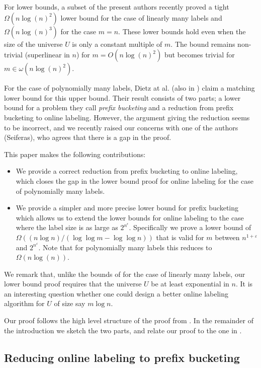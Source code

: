 \documentclass[runningheads,a4paper]{llncs}
\begin{document}
For lower bounds, a subset of the present authors 
recently proved \cite{BKS} a tight $\Omega(n \log(n)^2)$ lower bound for the case of linearly many labels and $\Omega(n \log(n)^3)$ for
the case $m=n$. These lower bounds hold even when the size of the universe $U$ is only a constant multiple of $m$.  The bound remains
non-trivial (superlinear in $n$) for $m  = O(n \log(n)^2)$ but
becomes trivial  for $m \in \omega(n \log(n)^2)$. 

For the case of polynomially many labels,
Dietz at al. \cite{DSZ04} (also in \cite{Zhang}) claim a matching lower bound for this upper bound.
Their result consists of two parts; a lower bound for a problem they call {\em prefix bucketing}
and a reduction from  prefix bucketing to online labeling.  However, the argument giving the reduction seems to be incorrect, 
and we recently raised our concerns with one of the authors (Seiferas), who agrees that
there is a gap in the proof. 

This paper makes the following contributions:

\begin{itemize}
\item We provide a correct reduction from prefix bucketing to  online labeling, which closes the gap in the lower
bound proof for online labeling for the case of polynomially many labels.
\item We provide a simpler and more precise lower bound for prefix bucketing which allows us to extend the lower bounds
for online labeling to the case where the label size is as large as $2^{n^\epsilon}$.
Specifically we prove a lower bound of $\Omega((n \log n) / (\log \log m - \log \log n))$ that is valid
for $m$ between $n^{1+\varepsilon}$ and $2^{n^{\varepsilon}}$.   Note that for
polynomially many labels this reduces to $\Omega(n \log(n))$. 
\end{itemize}

We remark that, unlike the bounds of \cite{BKS} for the case of linearly many labels, our lower bound proof requires that the universe
$U$ be  at least exponential in $n$. It is an interesting question whether one could design
a better online labeling algorithm for $U$ of size say $m \log n$. 

Our proof follows the high level structure of the proof from \cite{DSZ04}.  In the remainder of the introduction we sketch the two
parts, and relate our proof to the one in \cite{DSZ04}.


\subsection{Reducing online labeling to prefix bucketing}
\end{document}

